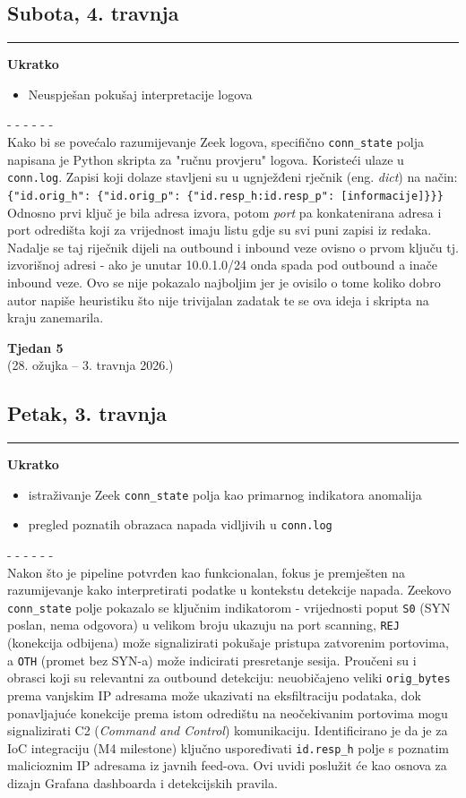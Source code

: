 \documentclass[12pt, a4paper]{article}
\newcommand{\tjedan}[2]{
    \newpage
    \vspace*{\fill}
    \begin{center}
        \addcontentsline{toc}{section}{Tjedan #1 (#2)}
        {\Huge \textbf{Tjedan #1}} \\[0.5em]
        {\Large (#2)}
    \end{center}
    \vspace*{\fill}
    \newpage
}
\newcommand{\dan}[1]{
    \subsection*{#1}
    \vspace{-0.5em} 
    \hrule \vspace{0.5em} 
}
\begin{document}
\dan{Subota, 4. travnja}
\textbf{Ukratko}
\begin{itemize}
    \item Neuspješan pokušaj interpretacije logova
\end{itemize}
- - - - - - \\
Kako bi se povećalo razumijevanje Zeek logova, specifično \lstinline|conn_state| polja napisana
je Python skripta za "ručnu provjeru" logova. Koristeći ulaze u \lstinline|conn.log|. Zapisi koji dolaze stavljeni
su u ugnježđeni rječnik (eng. \textit{dict}) na način:
\lstinline|{"id.orig_h": {"id.orig_p": {"id.resp_h:id.resp_p": [informacije]}}}|
Odnosno prvi ključ je bila adresa izvora, potom \textit{port} pa konkatenirana adresa i port
odredišta koji za vrijednost imaju listu gdje su svi puni zapisi iz redaka.
Nadalje se taj riječnik dijeli na outbound i inbound veze ovisno o prvom ključu tj.
izvorišnoj adresi - ako je unutar 10.0.1.0/24 onda spada pod outbound a inače inbound veze.
Ovo se nije pokazalo najboljim jer je ovisilo o tome koliko dobro autor napiše heuristiku što nije
trivijalan zadatak te se ova ideja i skripta na kraju zanemarila.

\tjedan{5}{28. ožujka -- 3. travnja 2026.}

\dan{Petak, 3. travnja}
\textbf{Ukratko}
\begin{itemize}
    \item istraživanje Zeek \lstinline|conn_state| polja kao primarnog indikatora anomalija
    \item pregled poznatih obrazaca napada vidljivih u \lstinline|conn.log|
\end{itemize}
- - - - - - \\
Nakon što je pipeline potvrđen kao funkcionalan, fokus je premješten na razumijevanje
kako interpretirati podatke u kontekstu detekcije napada.
Zeekovo \lstinline|conn_state| polje pokazalo se ključnim indikatorom - vrijednosti poput
\lstinline|S0| (SYN poslan, nema odgovora) u velikom broju ukazuju na port scanning,
\lstinline|REJ| (konekcija odbijena) može signalizirati pokušaje pristupa zatvorenim portovima,
a \lstinline|OTH| (promet bez SYN-a) može indicirati presretanje sesija.
Proučeni su i obrasci koji su relevantni za outbound detekciju: neuobičajeno veliki
\lstinline|orig_bytes| prema vanjskim IP adresama može ukazivati na eksfiltraciju podataka,
dok ponavljajuće konekcije prema istom odredištu na neočekivanim portovima mogu
signalizirati C2 (\textit{Command and Control}) komunikaciju.
Identificirano je da je za IoC integraciju (M4 milestone) ključno uspoređivati
\lstinline|id.resp_h| polje s poznatim malicioznim IP adresama iz javnih feed-ova.
Ovi uvidi poslužit će kao osnova za dizajn Grafana dashboarda i detekcijskih pravila.
 
\end{document}

